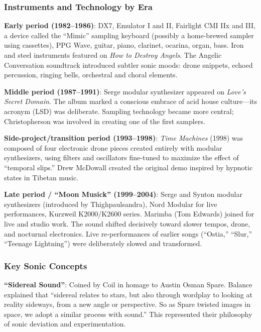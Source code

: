 \documentclass[11pt,letterpaper]{article}
\begin{document}
\subsubsection{Instruments and Technology by Era}

\textbf{Early period (1982--1986)}: DX7, Emulator I and II, Fairlight CMI IIx and III, a device called the ``Mimic'' sampling keyboard (possibly a home-brewed sampler using cassettes), PPG Wave, guitar, piano, clarinet, ocarina, organ, bass. Iron and steel instruments featured on \textit{How to Destroy Angels}. The Angelic Conversation soundtrack introduced subtler sonic moods: drone snippets, echoed percussion, ringing bells, orchestral and choral elements.

\textbf{Middle period (1987--1991)}: Serge modular synthesizer appeared on \textit{Love's Secret Domain}. The album marked a conscious embrace of acid house culture---its acronym (LSD) was deliberate. Sampling technology became more central; Christopherson was involved in creating one of the first samplers.

\textbf{Side-project/transition period (1993--1998)}: \textit{Time Machines} (1998) was composed of four electronic drone pieces created entirely with modular synthesizers, using filters and oscillators fine-tuned to maximize the effect of ``temporal slips.'' Drew McDowall created the original demo inspired by hypnotic states in Tibetan music.

\textbf{Late period / ``Moon Musick'' (1999--2004)}: Serge and Synton modular synthesizers (introduced by Thighpaulsandra), Nord Modular for live performances, Kurzweil K2000/K2600 series. Marimba (Tom Edwards) joined for live and studio work. The sound shifted decisively toward slower tempos, drone, and nocturnal electronics. Live re-performances of earlier songs (``Ostia,'' ``Slur,'' ``Teenage Lightning'') were deliberately slowed and transformed.

\subsubsection{Key Sonic Concepts}

\textbf{``Sidereal Sound''}: Coined by Coil in homage to Austin Osman Spare. Balance explained that ``sidereal relates to stars, but also through wordplay to looking at reality sideways, from a new angle or perspective. So as Spare twisted images in space, we adopt a similar process with sound.'' This represented their philosophy of sonic deviation and experimentation.
\end{document}
